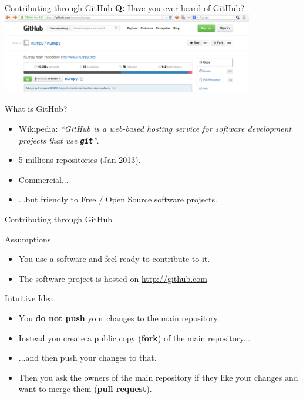 \documentclass{beamer}
\newcommand{\git}{\texttt{\textbf{git}}\xspace}
\begin{document}
\begin{frame}{Contributing through GitHub}
  \textbf{Q:} Have you ever heard of GitHub?
  \includegraphics[width=11cm]{figs/github}
  \begin{block}{What is GitHub?}
    \begin{itemize}
    \item Wikipedia: \emph{``GitHub is a web-based hosting service for
        software development projects that use \git''}.
    \item 5 millions repositories (Jan 2013).
    \item Commercial...
    \item ...but friendly to Free / Open Source software projects.
    \end{itemize}
  \end{block}
\end{frame}

\begin{frame}{Contributing through GitHub}
  \begin{block}{Assumptions}
    \begin{itemize}
    \item You use a software and feel ready to contribute to it.
    \item The software project is hosted on \url{http://github.com}
    \end{itemize}
  \end{block}
  \begin{block}{Intuitive Idea}
    \begin{itemize}
    \item You \textbf{do not push} your changes to the main
      repository.
    \item Instead you create a public copy (\textbf{fork}) of the main
      repository...
    \item ...and then push your changes to that.
    \item Then you ask the owners of the main repository if they like
      your changes and want to merge them (\textbf{pull request}).
    \end{itemize}
  \end{block}
\end{frame}
\end{document}
